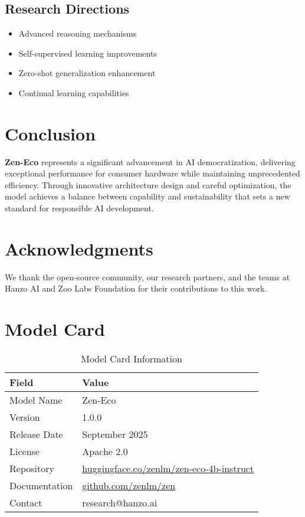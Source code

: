 \documentclass[11pt,a4paper]{article}
\begin{document}
\subsection{Research Directions}
\begin{itemize}
    \item Advanced reasoning mechanisms
    \item Self-supervised learning improvements
    \item Zero-shot generalization enhancement
    \item Continual learning capabilities
\end{itemize}

\section{Conclusion}

\textbf{Zen-Eco} represents a significant advancement in AI democratization, 
delivering exceptional performance for consumer hardware while maintaining 
unprecedented efficiency. Through innovative architecture design and careful optimization, 
the model achieves a balance between capability and sustainability that sets a new standard 
for responsible AI development.

\section*{Acknowledgments}

We thank the open-source community, our research partners, and the teams at Hanzo AI and 
Zoo Labs Foundation for their contributions to this work.




\appendix

\section{Model Card}

\begin{table}[H]
\centering
\begin{tabular}{ll}
\toprule
\textbf{Field} & \textbf{Value} \\
\midrule
Model Name & Zen-Eco \\
Version & 1.0.0 \\
Release Date & September 2025 \\
License & Apache 2.0 \\
Repository & \href{https://huggingface.co/zenlm/zen-eco-4b-instruct}{huggingface.co/zenlm/zen-eco-4b-instruct} \\
Documentation & \href{https://github.com/zenlm/zen}{github.com/zenlm/zen} \\
Contact & research@hanzo.ai \\
\bottomrule
\end{tabular}
\caption{Model Card Information}
\end{table}
\end{document}
